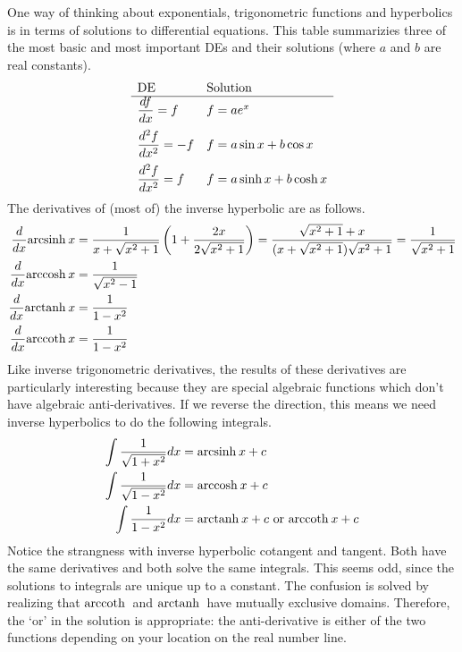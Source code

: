 \documentclass[fleqn]{report}
\begin{document}
One way of thinking about exponentials, trigonometric
functions and hyperbolics is in terms of solutions to
differential equations. This table summarizies three of the
most basic and most important DEs and their solutions (where
$a$ and $b$ are real constants).
\begin{displaymath}
\begin{array}{ll}
\text{DE} & \text{Solution} \\
\hline 
\dfrac{df}{dx} = f & f = ae^x \vspace{.2cm} \\
\dfrac{d^2f}{dx^2} = -f & f = a \sin x + b \cos x
\vspace{.2cm} \\
\dfrac{d^2f}{dx^2} = f & f = a \sinh x + b \cosh x
\end{array}
\end{displaymath}
The derivatives of (most of) the inverse hyperbolic are as follows. 
\begin{align*}
\frac{d}{dx} \mathrm{arcsinh\hspace{0.07cm}} x & = \frac{1}{x + \sqrt{x^2+1}} \left( 1
+ \frac{2x}{2 \sqrt{x^2+1}} \right) = \frac{\sqrt{x^2+1} + x}{(x
+ \sqrt{x^2+1}) \sqrt{x^2+1}} = \frac{1}{\sqrt{x^2+1}} \\
\frac{d}{dx} \mathrm{arccosh\hspace{0.07cm}} x & = \frac{1}{\sqrt{x^2-1}} \\
\frac{d}{dx} \mathrm{arctanh\hspace{0.07cm}} x & = \frac{1}{1-x^2} \\
\frac{d}{dx} \mathrm{arccoth\hspace{0.07cm}} x & = \frac{1}{1-x^2}
\end{align*}
Like inverse trigonometric derivatives, the results of these
derivatives are particularly interesting because they are
special algebraic functions which don't have algebraic
anti-derivatives. If we reverse the direction, this means we
need inverse hyperbolics to do the following integrals.
\begin{align*}
\int \frac{1}{\sqrt{1+x^2}} dx & = \mathrm{arcsinh\hspace{0.07cm}} x + c \\
\int \frac{1}{\sqrt{1-x^2}} dx & = \mathrm{arccosh\hspace{0.07cm}} x + c \\
\int \frac{1}{1 - x^2} dx & = \mathrm{arctanh\hspace{0.07cm}} x + c \text{ or }
\mathrm{arccoth\hspace{0.07cm}} x + c
\end{align*}
Notice the strangness with inverse hyperbolic cotangent and
tangent. Both have the same derivatives and both solve the
same integrals. This seems odd, since the
solutions to integrals are unique up to a constant. The
confusion is solved by realizing that $\mathrm{arccoth\hspace{0.07cm}}$ and $\mathrm{arctanh\hspace{0.07cm}}$
have mutually exclusive domains. Therefore, the `or' in the
solution is appropriate: the anti-derivative is either of the
two functions depending on your location on the real number
line.
\end{document}
